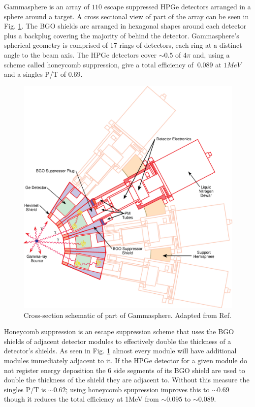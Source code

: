 Gammasphere is an array of $110$ escape suppressed HPGe detectors arranged in a sphere around a target. A cross sectional view of part of the array can be seen in Fig. \ref{fig:chp3-gs_det_schem}. The BGO shields are arranged in hexagonal shapes around each detector plus a backplug covering the majority of behind the detector. Gammasphere's spherical geometry is comprised of 17 rings of detectors, each ring at a distinct angle to the beam axis. The HPGe detectors cover $\sim0.5$ of $4\pi$ and, using a scheme called honeycomb suppression, give a total efficiency of $~0.089$ at $1MeV$ and a singles P/T of $0.69$.
\begin{figure}
	\centerline{\includegraphics[height=0.4\textheight]{./img/c3/gammasphere_detector.eps}}
	\caption{Cross-section schematic of part of Gammasphere. Adapted from Ref.\cite{gsBooklet}}
	\label{fig:chp3-gs_det_schem}
\end{figure}

Honeycomb suppression is an escape suppression scheme that uses the BGO shields of adjacent detector modules to effectively double the thickness of a detector's shields. As seen in Fig. \ref{fig:chp3-gs_det_schem} almost every module will have additional modules immediately adjacent to it. If the HPGe detector for a given module do not register energy deposition the 6 side segments of its BGO shield are used to double the thickness of the shield they are adjacent to. Without this measure the singles P/T is $\sim0.62$; using honeycomb spupression improves this to $\sim0.69$ though it reduces the total efficiency at 1MeV from $\sim0.095$ to $\sim0.089$.

